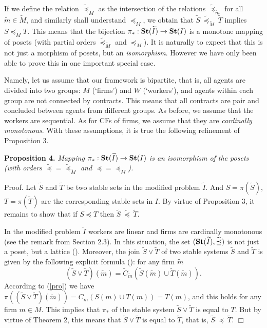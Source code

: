 \documentclass[12pt,a4paper]{article}
\begin{document}
If we define the relation  $\widetilde\preceq _{\widetilde M}$ as the intersection of the relations $\widetilde \preceq_{\widetilde m}$ for all $\widetilde m \in \widetilde M$, and similarly shall understand $\preceq_M$, we obtain that
$\widetilde S \ \widetilde \preceq _{\widetilde M} \ \widetilde T$ implies $S \preceq _M T$. This means that the bijection $\pi_*: {\bf St}(\widetilde I)\to {\bf St}(I)$ is a monotone mapping of posets (with partial orders $\widetilde \preceq _{\widetilde M}$ and $\preceq _M$). It is naturally to expect that this is not just a morphism of posets, but an \emph{isomorphism}. However we have only been able to prove this in one important special case.

Namely, let us assume that our framework is bipartite, that is, all agents are divided into two groups: $M$ (`firms') and $W$ (`workers'), and agents within each group are not connected by contracts. This means that all contracts are pair and concluded between agents from different groups. As before, we assume that the workers are sequential. As for CFs of firms, we assume that they are \emph{cardinally monotonous}. With these assumptions, it is true the following refinement of Proposition 3.\medskip

\textbf{Proposition 4.} \emph{Mapping $\pi _*: {\bf St}(\widetilde I) \to {\bf St}(I)$ is an isomorphism of the posets (with orders $\widetilde\preceq =\widetilde \preceq _{\widetilde M}$ and $\preceq =\preceq _M$).}\medskip

Proof. Let $\widetilde{S}$ and $\widetilde{T}$ be two stable sets in the modified problem $\widetilde{I}$. And $S=\pi (\widetilde S)$, $T=\pi (\widetilde T)$ are the corresponding stable sets in $I$. By virtue of Proposition 3, it remains to show that if $S\preceq T$ then $\widetilde S \ \widetilde{\preceq} \ \widetilde T$.

In the modified problem $\widetilde I$ workers are linear and firms are cardinally monotonous (see the remark from Section 2.3). In this situation, the set $({\bf St}(\widetilde I), \widetilde \preceq )$ is not just a poset, but a lattice (\cite{B}). Moreover, the join $\widetilde S\vee \widetilde T$ of two stable systems $\widetilde S$ and $\widetilde T$ is given by the following explicit formula (\cite{A,F}): for any firm $\widetilde m$
                              $$
(\widetilde S\vee \widetilde T)(\widetilde m)=\widetilde C_{\widetilde m} (\widetilde S(\widetilde m)\cup \widetilde T(\widetilde m)).
                                $$
According to (\ref{pro}) we have $\pi ((\widetilde S\vee \widetilde T)(\widetilde m))=C_m(S(m)\cup T(m))=T(m)$, and this holds for any firm $m\in M$. This implies that $\pi_*$ of the stable system $\widetilde S\vee\widetilde T$ is equal to $T$. But by virtue of Theorem 2, this means that $\widetilde S\vee \widetilde T$ is equal to $\widetilde{T}$, that is, $\widetilde S\widetilde \ \preceq \ \widetilde T$.  $\Box$\medskip
\end{document}
